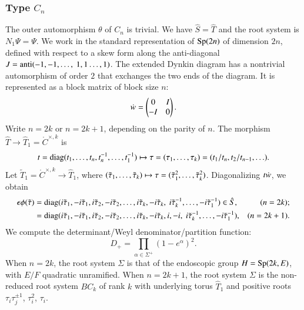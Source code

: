 


\subsubsection{Type $C_n$}

The outer automorphism $\theta$ of $C_n$ is trivial.  We have $\hat S = \hat T$ and the root system is $N_1\Psi =\Psi$.
We work in the standard representation of ${\operatorname{Sp}}(2n)$ of dimension $2n$, defined with respect to a skew form 
along the anti-diagonal $J = {\operatorname{anti}}(-1,-1,\ldots,\ 1,1\ldots,1)$.  
The extended Dynkin diagram has a nontrivial automorphism of order $2$ that exchanges the two ends of the diagram.
It is represented as a block matrix of block size $n$:
\[
\dot w = \begin{pmatrix} 0 &I \\ -I & 0\end{pmatrix}.
\]
Write $n = 2k$ or $n = 2k+1$, depending on the parity of $n$.
The morphism $\hat T\to \hat T_1=\ring{C}^{\times,k}$ is 
\[
t = {\operatorname{diag}}(t_1,\ldots,t_n,t_n^{-1},\ldots,t_1^{-1})\mapsto \tau=(\tau_1,\ldots,\tau_k)=(t_1/t_n,t_2/t_{n-1},\ldots).
\]
Let $\tilde T_1=\ring{C}^{\times,k} \to \hat T_1$, where $(\tilde\tau_1,\ldots,\tilde\tau_k)\mapsto \tau=(\tilde\tau_1^2,\ldots,\tilde\tau_k^2)$.
Diagonalizing $t\dot w$, we obtain
\begin{align*}
\epsilon\phi(\ttau) &= \op{diag}(i \ttau_1,-i\ttau_1,i\ttau_2,-i\ttau_2,\ldots,i\ttau_k,-i\ttau_k,\ i\ttau_k^{-1},\ldots, -i\ttau_1^{-1})\in \hat S,& (n = 2k);\\
    &= \op{diag}(i \ttau_1,-i\ttau_1,i\ttau_2,-i\ttau_2,\ldots,i\ttau_k,-i\ttau_k,i,-i,\ i\ttau_k^{-1},\ldots, -i\ttau_1^{-1}),& (n = 2k+1).\\
\end{align*}
We compute the determinant/Weyl denominator/partition function:
\begin{equation}
D_+ = \prod_{\alpha\in \Sigma^+} (1-e^\alpha)^2.
\end{equation}
When $n=2k$, the root system $\Sigma$ is that of the endoscopic group $H={\operatorname{Sp}}(2k,E)$, with $E/F$ quadratic unramified.
When $n=2k+1$, the root system $\Sigma$ is the non-reduced root system $BC_k$ of rank $k$ with underlying torus $\hat T_1$
and positive roots $\tau_i \tau_j^{\pm 1}$, $\tau_i^2$, $\tau_i$.

